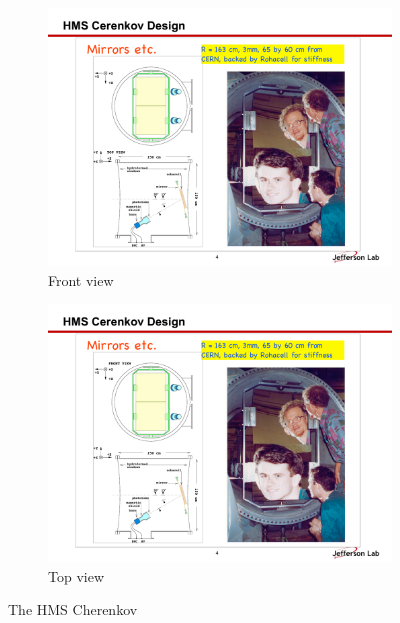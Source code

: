 \begin{figure}[ht]
    \centering
    \begin{subfigure}[b]{0.4\textwidth}
        \centering
        \includegraphics[width=\textwidth]{chap3/hms_cer_front.pdf}
        \caption{Front view}
        \label{fig:hms_cer_front}
    \end{subfigure}
    \hfill
    \begin{subfigure}[b]{0.4\textwidth}
        \centering
        \includegraphics[width=\textwidth]{chap3/hms_cer_top.pdf}
        \caption{Top view}
        \label{fig:hms_cer_top}
    \end{subfigure}
    \caption{The HMS Cherenkov}
    \label{fig:hms_cherenkov}
\end{figure}

